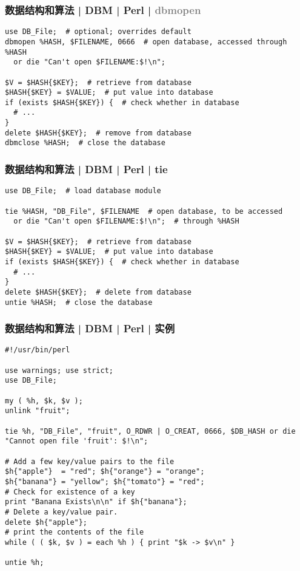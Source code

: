 \begin{frame}[fragile]
  \frametitle{数据结构和算法 | DBM | Perl | \textcolor{gray}{dbmopen}}
\begin{lstlisting}
use DB_File;  # optional; overrides default
dbmopen %HASH, $FILENAME, 0666  # open database, accessed through %HASH
  or die "Can't open $FILENAME:$!\n";

$V = $HASH{$KEY};  # retrieve from database
$HASH{$KEY} = $VALUE;  # put value into database
if (exists $HASH{$KEY}) {  # check whether in database
  # ...
}
delete $HASH{$KEY};  # remove from database
dbmclose %HASH;  # close the database
\end{lstlisting}
\end{frame}

\begin{frame}[fragile]
  \frametitle{数据结构和算法 | DBM | Perl | tie}
\begin{lstlisting}
use DB_File;  # load database module

tie %HASH, "DB_File", $FILENAME  # open database, to be accessed
  or die "Can't open $FILENAME:$!\n";  # through %HASH

$V = $HASH{$KEY};  # retrieve from database
$HASH{$KEY} = $VALUE;  # put value into database
if (exists $HASH{$KEY}) {  # check whether in database
  # ...
}
delete $HASH{$KEY};  # delete from database
untie %HASH;  # close the database
\end{lstlisting}
\end{frame}

\begin{frame}[fragile]
  \frametitle{数据结构和算法 | DBM | Perl | 实例}
\begin{lstlisting}[basicstyle=\scriptsize\tt,numberstyle=\scriptsize]
#!/usr/bin/perl

use warnings; use strict;
use DB_File;

my ( %h, $k, $v );
unlink "fruit";

tie %h, "DB_File", "fruit", O_RDWR | O_CREAT, 0666, $DB_HASH or die "Cannot open file 'fruit': $!\n";

# Add a few key/value pairs to the file
$h{"apple"}  = "red"; $h{"orange"} = "orange";
$h{"banana"} = "yellow"; $h{"tomato"} = "red";
# Check for existence of a key
print "Banana Exists\n\n" if $h{"banana"};
# Delete a key/value pair.
delete $h{"apple"};
# print the contents of the file
while ( ( $k, $v ) = each %h ) { print "$k -> $v\n" }

untie %h;
\end{lstlisting}
\end{frame}

